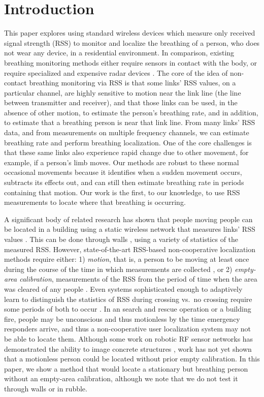 \documentclass[10pt,journal,letterpaper]{IEEEtran}
\begin{document}
\section{Introduction} \label{S:Introduction}
This paper explores using standard wireless devices which measure only received signal strength (RSS) to monitor and localize the breathing of a person, who does not wear any device, in a residential environment.  In comparison, existing breathing monitoring methods either require sensors in contact with the body, or require specialized and expensive radar devices \cite{rivera2006multi,park2006single}.  The core of the idea of non-contact breathing monitoring via RSS is that some links' RSS values, on a particular channel, are highly sensitive to motion near the link line (the line between transmitter and receiver), and that those links can be used, in the absence of other motion, to estimate the person's breathing rate, and in addition, to estimate that a breathing person is near that link line.  From many links' RSS data, and from measurements on multiple frequency channels, we can estimate breathing rate and perform breathing localization. One of the core challenges is that these same links also 
experience rapid change due to other movement, for example, if a person's limb moves.  Our methods are robust to these normal occasional movements because it identifies when a sudden movement occurs, subtracts its effects out, and can still then estimate breathing rate in periods containing that motion.  Our work is the first, to our knowledge, to use RSS measurements to locate where that breathing is occurring.

A significant body of related research has shown that people moving people can be located in a building using a static wireless network that measures links' RSS values \cite{woyach06,zhang2007rf,patwari08b,zhang2009dynamic,kanso09b,wilson09a,chen11sequential}.  This can be done through walls \cite{wilson10see,zhao11noise,zheng2012through}, using a variety of statistics of the measured RSS.  However, state-of-the-art RSS-based non-cooperative localization methods require either: 1) \emph{motion}, that is, a person to be moving at least once during the course of the time in which measurements are collected \cite{wilson10see, youssef07,kaltiokallio2011}, or 2) \emph{empty-area calibration}, measurements of the RSS from the period of time when the area was cleared of any people \cite{patwari08b,wilson09a}.  Even systems sophisticated enough to adaptively learn to distinguish the statistics of RSS during crossing vs.~no crossing require some periods of both to occur \cite{zheng2012through}.  In an search and 
rescue operation or a building fire, people may be unconscious and thus motionless by the time emergency responders arrive, and thus a non-cooperative user localization system may not be able to locate them.  Although some work on robotic RF sensor networks has demonstrated the ability to image concrete structures \cite{mostofi2011compressive}, work has not yet shown that a motionless person could be located without prior empty calibration.  In this paper, we show a method that would locate a stationary but breathing person without an empty-area calibration, although we note that we do not test it through walls or in rubble.
\end{document}

